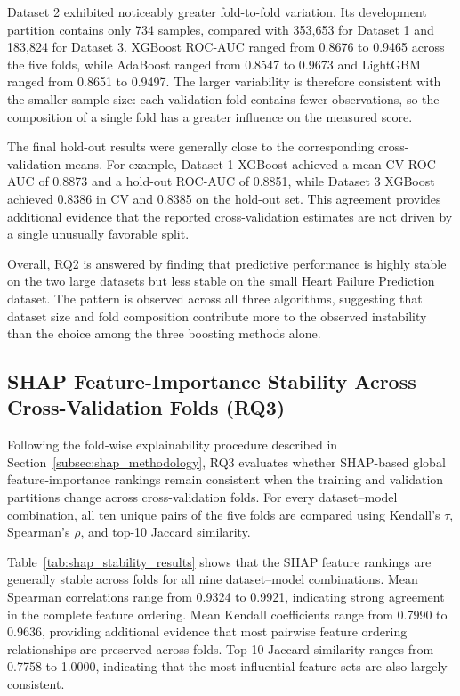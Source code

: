 Dataset 2 exhibited noticeably greater fold-to-fold variation. Its development
partition contains only 734 samples, compared with 353,653 for Dataset 1 and
183,824 for Dataset 3. XGBoost ROC-AUC ranged from 0.8676 to 0.9465 across the
five folds, while AdaBoost ranged from 0.8547 to 0.9673 and LightGBM ranged from
0.8651 to 0.9497. The larger variability is therefore consistent with the
smaller sample size: each validation fold contains fewer observations, so the
composition of a single fold has a greater influence on the measured score.

The final hold-out results were generally close to the corresponding
cross-validation means. For example, Dataset 1 XGBoost achieved a mean CV
ROC-AUC of 0.8873 and a hold-out ROC-AUC of 0.8851, while Dataset 3 XGBoost
achieved 0.8386 in CV and 0.8385 on the hold-out set. This agreement provides
additional evidence that the reported cross-validation estimates are not driven
by a single unusually favorable split.

Overall, RQ2 is answered by finding that predictive performance is highly stable
on the two large datasets but less stable on the small Heart Failure Prediction
dataset. The pattern is observed across all three algorithms, suggesting that
dataset size and fold composition contribute more to the observed instability
than the choice among the three boosting methods alone.


\subsection{SHAP Feature-Importance Stability Across Cross-Validation Folds (RQ3)}
\label{subsec:shap_results}

Following the fold-wise explainability procedure described in
Section~\ref{subsec:shap_methodology}, RQ3 evaluates whether SHAP-based global
feature-importance rankings remain consistent when the training and validation
partitions change across cross-validation folds. For every dataset--model
combination, all ten unique pairs of the five folds are compared using Kendall's
$\tau$, Spearman's $\rho$, and top-10 Jaccard similarity.

Table~\ref{tab:shap_stability_results} shows that the SHAP feature rankings are
generally stable across folds for all nine dataset--model combinations.
Mean Spearman correlations range from 0.9324 to 0.9921, indicating strong
agreement in the complete feature ordering. Mean Kendall coefficients range
from 0.7990 to 0.9636, providing additional evidence that most pairwise feature
ordering relationships are preserved across folds. Top-10 Jaccard similarity
ranges from 0.7758 to 1.0000, indicating that the most influential feature sets
are also largely consistent.

